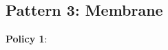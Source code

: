 \documentclass[a4paper,11pt, twoside,twocolumn]{article}
\begin{document}
\subsection{Pattern 3: Membrane}




\textbf{Policy 1}:




\small



\end{document}
